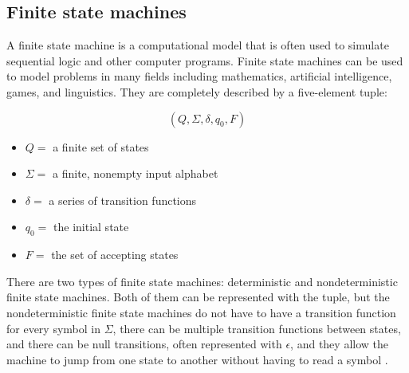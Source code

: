   \subsection{Finite state machines} \label{subsec:finite}
      A finite state machine is a computational model that is often used to simulate sequential logic and other computer programs. Finite state machines can be used to model problems in many fields including mathematics, artificial intelligence, games, and linguistics. They are completely described by a five-element tuple:
      \begin{multicols}{2}
      \begin{equation*}
      	(Q,\Sigma,\delta,q_0,F)
      \end{equation*}
      \columnbreak
      \begin{itemize}
      \item $Q=$ a finite set of states
      \item $\Sigma=$ a finite, nonempty input alphabet
      \item $\delta=$ a series of transition functions
      \item $q_0=$ the initial state
      \item $F=$ the set of accepting states
      \end{itemize}\end{multicols}

There are two types of finite state machines: deterministic and nondeterministic finite state machines. Both of them can be represented with the tuple, but the nondeterministic finite state machines do not have to have a transition function for every symbol in $\Sigma$, there can be multiple transition functions between states, and there can be null transitions, often represented with $\epsilon$, and they allow the machine to jump from one state to another without having to read a symbol \cite{brilliantFinite}.

